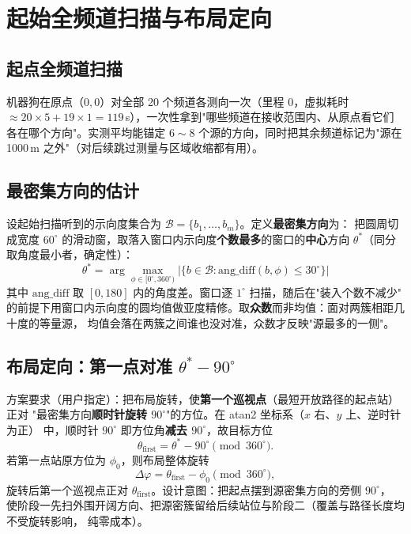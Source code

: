 \documentclass[a4paper,11pt]{ctexart}
\begin{document}
\section{起始全频道扫描与布局定向}
\subsection{起点全频道扫描}
机器狗在原点（$0,0$）对全部 20 个频道各测向一次（里程 0，虚拟耗时 $\approx 20\times5+19\times1
=119$\,s），一次性拿到"哪些频道在接收范围内、从原点看它们各在哪个方向"。实测平均能锚定
$6\!\sim\!8$ 个源的方向，同时把其余频道标记为"源在 1000\,m 之外"（对后续跳过测量与区域收缩都有用）。

\subsection{最密集方向的估计}
设起始扫描听到的示向度集合为 $\mathcal{B}=\{b_1,\dots,b_m\}$。定义\textbf{最密集方向}为：
把圆周切成宽度 $60^\circ$ 的滑动窗，取落入窗口内示向度\textbf{个数最多}的窗口的\textbf{中心}方向
$\theta^*$（同分取角度最小者，确定性）：
\begin{equation}
  \theta^* = \arg\max_{\phi\in[0^\circ,360^\circ)}
  \bigl|\{b\in\mathcal{B} : \mathrm{ang\_diff}(b,\phi)\le 30^\circ\}\bigr|
  \label{eq:dense}
\end{equation}
其中 $\mathrm{ang\_diff}$ 取 $[0,180]$ 内的角度差。窗口逐 $1^\circ$ 扫描，随后在"装入个数不减少"
的前提下用窗口内示向度的圆均值做亚度精修。取\textbf{众数}而非均值：面对两簇相距几十度的等量源，
均值会落在两簇之间谁也没对准，众数才反映"源最多的一侧"。

\subsection{布局定向：第一点对准 $\theta^*-90^\circ$}
方案要求（用户指定）：把布局旋转，使\textbf{第一个巡视点}（最短开放路径的起点站）正对
"最密集方向\textbf{顺时针旋转 $90^\circ$}"的方位。在 atan2 坐标系（$x$ 右、$y$ 上、逆时针为正）
中，顺时针 $90^\circ$ 即方位角\textbf{减去 $90^\circ$}，故目标方位
\begin{equation}
  \theta_{\text{first}} = \theta^* - 90^\circ \pmod{360^\circ} .
  \label{eq:target}
\end{equation}
若第一点站原方位为 $\phi_0$，则布局整体旋转
\begin{equation}
  \Delta\varphi = \theta_{\text{first}} - \phi_0 \pmod{360^\circ},
  \label{eq:rotate}
\end{equation}
旋转后第一个巡视点正对 $\theta_{\text{first}}$。设计意图：把起点摆到源密集方向的旁侧 $90^\circ$，
使阶段一先扫外围开阔方向、把源密簇留给后续站位与阶段二（覆盖与路径长度均不受旋转影响，
纯零成本）。
\end{document}
